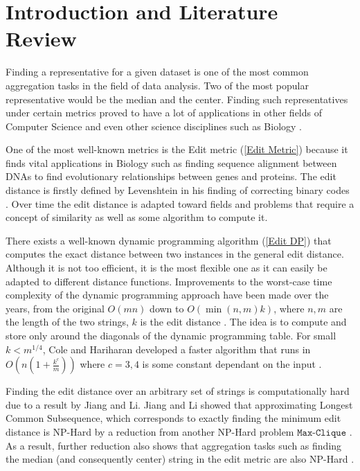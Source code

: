 \chapter{Introduction and Literature Review}
\label{Introduction}
Finding a representative for a given dataset is one of the most common aggregation tasks in the field of data analysis. Two of the most popular representative would be the median and the center. Finding such representatives under certain metrics proved to have a lot of applications in other fields of Computer Science and even other science disciplines such as Biology \cite{ApproximateStringMatching, StringTreeSequence}.

One of the most well-known metrics is the Edit metric (\ref{Edit Metric}) because it finds vital applications in Biology such as finding sequence alignment between DNAs to find evolutionary relationships between genes and proteins. The edit distance is firstly defined by Levenshtein in his finding of correcting binary codes \cite{Levenshtein}. Over time the edit distance is adapted toward fields and problems that require a concept of similarity as well as some algorithm to compute it.

There exists a well-known dynamic programming algorithm (\ref{Edit DP}) that computes the exact distance between two instances in the general edit distance. Although it is not too efficient, it is the most flexible one as it can easily be adapted to different distance functions. Improvements to the worst-case time complexity of the dynamic programming approach have been made over the years, from the original $O(m n)$ down to $O(\min(n, m) k)$, where $n, m$ are the length of the two strings, $k$ is the edit distance \cite{Ukkonen}. The idea is to compute and store only around the diagonals of the dynamic programming table. For small $k < m^{1 / 4}$, Cole and Hariharan developed a faster algorithm that runs in $O(n(1 + \frac{k^c}{m}))$ where $c = 3, 4$ is some constant dependant on the input \cite{ColeHariharan}.

Finding the edit distance over an arbitrary set of strings is computationally hard due to a result by Jiang and Li. Jiang and Li showed that approximating Longest Common Subsequence, which corresponds to exactly finding the minimum edit distance is NP-Hard by a reduction from another NP-Hard problem $\texttt{Max-Clique}$ \cite{HardLCS}. As a result, further reduction also shows that aggregation tasks such as finding the median (and consequently center) string in the edit metric are also NP-Hard \cite{MedianString}.

